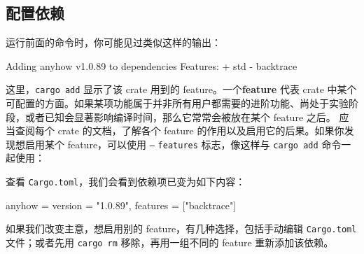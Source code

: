 \subsection{配置依赖}
\label{idx:idx_56ce6d20}
运行前面的命令时，你可能见过类似这样的输出：
\begin{codeboxdark}
Adding anyhow v1.0.89 to dependencies
       Features:
       + std
       - backtrace
\end{codeboxdark}
这里，\texttt{cargo add} 显示了该 crate 用到的 feature。一个\textbf{feature} 代表 crate 中某个可配置的方面。如果某项功能属于并非所有用户都需要的进阶功能、尚处于实验阶段，或者已知会显著影响编译时间，那么它常常会被放在某个 feature 之后。
应当查阅每个 crate 的文档，了解各个 feature 的作用以及启用它的后果。如果你发现想启用某个 feature，可以使用 \texttt{--}
\texttt{features} 标志，像这样与 \texttt{cargo add} 命令一起使用：
查看 \texttt{Cargo.toml}，我们会看到依赖项已变为如下内容：
\begin{codebox}[text]
[dependencies]
anyhow = { version = "1.0.89", features = ["backtrace"] }
\end{codebox}
如果我们改变主意，想启用别的 feature，有几种选择，包括手动编辑 \texttt{Cargo.toml} 文件；或者先用 \texttt{cargo rm} 移除，再用一组不同的 feature 重新添加该依赖。
